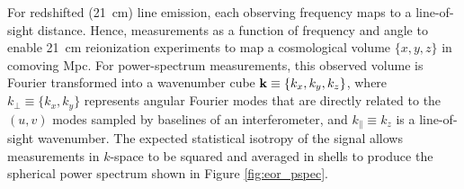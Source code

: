 \documentclass[preprint]{aastex}
\def\kperp{k_{\bot}}
\def\kpar{k_{\|}}
\def\kperp{k_{\bot}}
\def\kpar{k_{\|}}
\def\k{{\bf k}}
\begin{document}
For redshifted (21~cm) line emission, each observing frequency maps to
a line-of-sight distance.  Hence, measurements as a function of frequency and angle 
to enable 21~cm reionization experiments to map a cosmological volume $\{x,y,z\}$ in
comoving Mpc.  For power-spectrum measurements, this observed volume is Fourier transformed into a 
wavenumber cube $\k\equiv\{k_{x}, k_{y}, k_{z}\}$, where 
$\kperp\equiv\{k_{x},k_{y}\}$ represents angular Fourier modes that are directly
related to the $(u,v)$ modes sampled by baselines of an interferometer, and $\kpar\equiv k_{z}$ is
a line-of-sight wavenumber.
The expected statistical isotropy of the signal allows measurements in $k$-space to be
squared and averaged in shells to produce the spherical power spectrum
shown in Figure \ref{fig:eor_pspec}.
\end{document}
